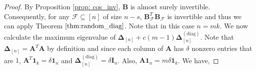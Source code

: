 \documentclass[journal,draftcls,onecolumn]{IEEEtran}
\theoremstyle{mystyle}
\newcommand{\bfX}{\mathbf{X}}
\newcommand{\bfA}{\mathbf{A}}
\newcommand{\bfB}{\mathbf{B}}
\newcommand{\cF}{\mathcal{F}}
\begin{document}
\begin{proof}









By Proposition \ref{prop: cos_inv}, $\bfB$ is almost surely invertible. Consequently, for any $\cF \subseteq [n]$ of size $n-s$, $\mathbf{B}_{\mathcal{F}}^T\mathbf{B}_{\mathcal{F}}$ is invertible and thus we can apply Theorem $\ref{thm:random_diag}$. 
Note that in this case $n = mk$. We now calculate the maximum eigenvalue of $\mathbf{\Delta}_{[n]} + c(m-1)\mathbf{\Delta}^{(\text{diag})}_{[n]}$. Note that $\mathbf{\Delta}_{[n]} = \bfA^T \bfA$ by definition and since each column of $\bfA$ has $\delta$ nonzero entries that are $1$, $\bfA^T \mathbf{1}_k = \delta \mathbf{1}_n$ and $\mathbf{\Delta}^{(\text{diag})}_{[n]} = \delta \mathbf{I}_n$. Also, $\bfA \mathbf{1}_n = m\delta \mathbf{1}_k$. We have, 


\end{proof}
\end{document}

